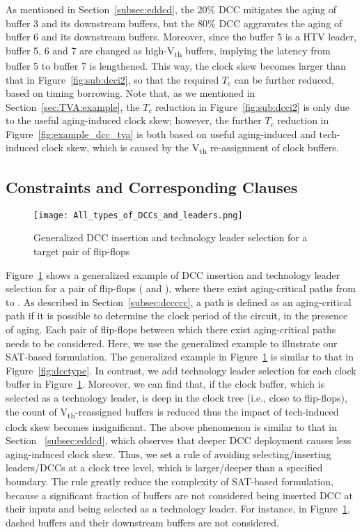 As mentioned in Section~\ref{subsec:eddcd}, the 20\% DCC mitigates the aging of buffer 3 and its downstream buffers, but the 80\% DCC aggravates the aging of buffer 6 and its downstream buffers. Moreover, since the buffer 5 is a HTV leader, buffer 5, 6 and 7 are changed as high-V\textsubscript{th} buffers, implying the latency from buffer 5 to buffer 7 is lengthened. This way, the clock skew becomes larger than that in Figure~\ref{fig:sub:dcci2}, so that the required $T_c$ can be further reduced, based on timing borrowing. Note that, as we mentioned in Section~\ref{sec:TVA:example}, the $T_c$ reduction in Figure~\ref{fig:sub:dcci2} is only due to the useful aging-induced clock skew; however, the  further $T_c$ reduction in Figure~\ref{fig:example_dcc_tva} is both based on useful aging-induced and tech-induced clock skew, which is caused by the V\textsubscript{th} re-assignment of clock buffers. 
\subsection{Constraints and Corresponding Clauses}
\label{sec:TVA:leaderconstraint}
\begin{figure}
    \centering
    \texttt{[image: All\_types\_of\_DCCs\_and\_leaders.png]}
    \caption{Generalized DCC insertion and technology leader selection for a target pair of flip-flops}
    \label{fig:g_dcc_leader}
\end{figure}

Figure~\ref{fig:g_dcc_leader} shows a generalized example of DCC insertion and technology leader selection for a pair of flip-flops ( and ), where there exist aging-critical paths from  to . As described in Section~\ref{subsec:dccccc}, a path is defined as an aging-critical path if it is possible to determine the clock period of the circuit, in the presence of aging. Each pair of flip-flops between which there exist aging-critical paths needs to be considered. Here, we use the generalized example to illustrate our SAT-based formulation. The generalized example in Figure~\ref{fig:g_dcc_leader} is similar to that in Figure~\ref{fig:dcctype}. In contrast, we add technology leader selection for each clock buffer in Figure~\ref{fig:g_dcc_leader}. Moreover, we can find that, if the clock buffer, which is selected as a technology leader, is deep in the clock tree (i.e., close to flip-flops), the count of V\textsubscript{th}-reassigned buffers is reduced thus the impact of tech-induced clock skew becomes insignificant. The above phenomenon is similar to that in Section ~\ref{subsec:eddcd}, which observes that deeper DCC deployment causes less aging-induced clock skew. Thus, we set a rule of avoiding selecting/inserting leaders/DCCs at a clock tree level, which is larger/deeper than a specified boundary.  The rule greatly reduce the complexity of SAT-based formulation, because a significant fraction of buffers are not considered being inserted DCC at their inputs and being selected as a technology leader. For instance, in Figure~\ref{fig:g_dcc_leader}, dashed buffers and their downstream buffers are not considered. 

